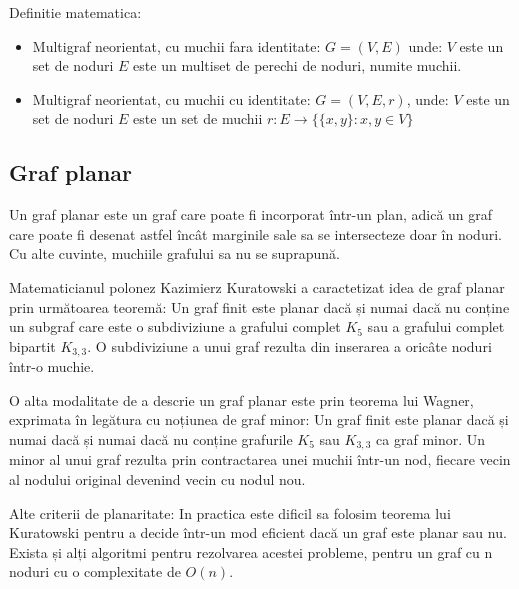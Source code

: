 Definitie matematica:\newline

\begin{itemize}
\item Multigraf neorientat, cu muchii fara identitate: 
\(G=(V,E)\) unde:\newline 
\(V\) este un set de noduri \newline 
\(E\) este un multiset de perechi de noduri, numite muchii.
    
\item Multigraf neorientat, cu muchii cu identitate:
\(G=(V,E,r)\), unde:\newline
\(V\) este un set de noduri\newline
\(E\) este un set de muchii\newline
\(r : E → \{\{x,y\} : x, y \in V\}\)

\end{itemize}

\subsection{Graf planar}

Un graf planar este un graf care poate fi incorporat într-un plan, adică un graf care poate fi desenat astfel încât 
marginile sale sa se intersecteze doar în noduri. Cu alte cuvinte, muchiile grafului sa nu se suprapună.\newline

Matematicianul polonez Kazimierz Kuratowski a caractetizat idea de graf planar prin următoarea teoremă:
Un graf finit este planar dacă și numai dacă nu conține un subgraf care este o subdiviziune a grafului complet \(K_5\) sau a grafului complet bipartit \(K_{3,3}\).
O subdiviziune a unui graf rezulta din inserarea a oricâte noduri într-o muchie.\newline

O alta modalitate de a descrie un graf planar este prin teorema lui Wagner, exprimata în legătura cu noțiunea de graf minor:
Un graf finit este planar dacă și numai dacă și numai dacă nu conține grafurile \(K_5\) sau \(K_{3,3}\) ca graf minor.
Un minor al unui graf rezulta prin contractarea unei muchii într-un nod, fiecare vecin al nodului original devenind vecin cu nodul nou.\newline

Alte criterii de planaritate:\newline
In practica este dificil sa folosim teorema lui Kuratowski pentru a decide într-un mod eficient dacă un graf este planar sau nu. 
Exista și alți algoritmi pentru rezolvarea acestei probleme, pentru un graf cu n noduri cu o complexitate de \(O(n)\).

